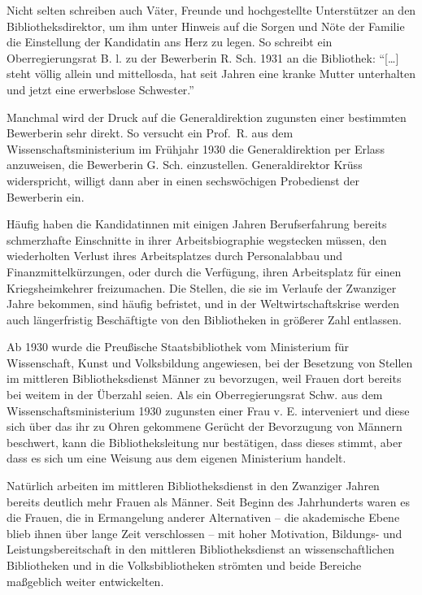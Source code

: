 \documentclass[a4paper,
fontsize=11pt,
oneside,
numbers=noperiodatend,
parskip=half-,
bibliography=totoc,
final
]{scrartcl}
\begin{document}
Nicht selten schreiben auch Väter, Freunde und hochgestellte
Unterstützer an den Bibliotheksdirektor, um ihm unter Hinweis auf die
Sorgen und Nöte der Familie die Einstellung der Kandidatin ans Herz zu
legen. So schreibt ein Oberregierungsrat B. l. zu der Bewerberin R. Sch.
1931 an die Bibliothek: \enquote{{[}\ldots{}{]} steht völlig allein und
mittellosda, hat seit Jahren eine kranke Mutter unterhalten und jetzt
eine erwerbslose Schwester.}

Manchmal wird der Druck auf die Generaldirektion zugunsten einer
bestimmten Bewerberin sehr direkt. So versucht ein Prof.~R. aus dem
Wissenschaftsministerium im Frühjahr 1930 die Generaldirektion per
Erlass anzuweisen, die Bewerberin G. Sch. einzustellen. Generaldirektor
Krüss widerspricht, willigt dann aber in einen sechswöchigen Probedienst
der Bewerberin ein.

Häufig haben die Kandidatinnen mit einigen Jahren Berufserfahrung
bereits schmerzhafte Einschnitte in ihrer Arbeitsbiographie wegstecken
müssen, den wiederholten Verlust ihres Arbeitsplatzes durch
Personalabbau und Finanzmittelkürzungen, oder durch die Verfügung, ihren
Arbeitsplatz für einen Kriegsheimkehrer freizumachen. Die Stellen, die
sie im Verlaufe der Zwanziger Jahre bekommen, sind häufig befristet, und
in der Weltwirtschaftskrise werden auch länger\-fristig Beschäftigte von
den Bibliotheken in größerer Zahl entlassen.

Ab 1930 wurde die Preußische Staatsbibliothek vom Ministerium für
Wissenschaft, Kunst und Volksbildung angewiesen, bei der Besetzung von
Stellen im mittleren Bibliotheksdienst Männer zu bevorzugen, weil Frauen
dort bereits bei weitem in der Überzahl seien. Als ein Oberregierungsrat
Schw. aus dem Wissenschaftsministerium 1930 zugunsten einer Frau v. E.
interveniert und diese sich über das ihr zu Ohren gekommene Gerücht der
Bevorzugung von Männern beschwert, kann die Bibliotheksleitung nur
bestätigen, dass dieses stimmt, aber dass es sich um eine Weisung aus
dem eigenen Ministerium handelt.

Natürlich arbeiten im mittleren Bibliotheksdienst in den Zwanziger
Jahren bereits deutlich mehr Frauen als Männer. Seit Beginn des
Jahrhunderts waren es die Frauen, die in Ermangelung anderer
Alternativen -- die akademische Ebene blieb ihnen über lange Zeit
verschlossen -- mit hoher Motivation, Bildungs- und
Leistungsbereitschaft in den mittleren Bibliotheksdienst an
wissenschaftlichen Bibliotheken und in die Volksbibliotheken strömten
und beide Bereiche maßgeblich weiter entwickelten.
\end{document}
